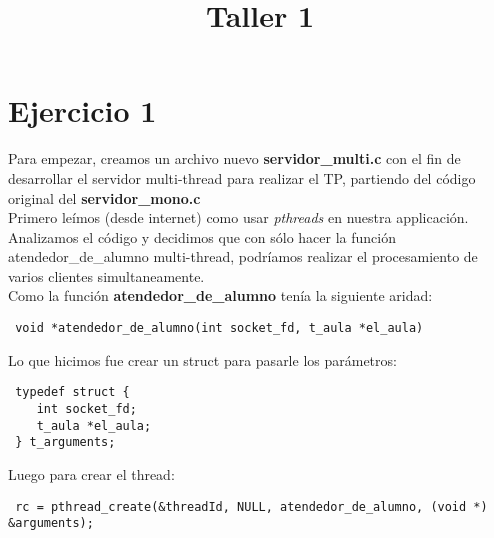 \documentclass[a4paper, 10pt]{article}
\title{Taller 1}
\begin{document}
\maketitle

\newpage

\section{Ejercicio 1}

Para empezar, creamos un archivo nuevo \textbf{servidor\_multi.c} con el fin de desarrollar el servidor multi-thread para realizar el TP, partiendo del c\'odigo original del \textbf{servidor\_mono.c} \\

Primero le\'imos (desde internet) como usar \textit{pthreads} en nuestra applicaci\'on.
Analizamos el c\'odigo y decidimos que con s\'olo hacer la funci\'on atendedor\_de\_alumno multi-thread, podr\'iamos realizar el procesamiento de varios clientes simultaneamente.\\ 

Como la funci\'on \textbf{atendedor\_de\_alumno} ten\'ia la siguiente aridad: 

\lstset{language=[ANSI]C++}
\begin{lstlisting}
 void *atendedor_de_alumno(int socket_fd, t_aula *el_aula)
\end{lstlisting} 
\vspace*{2em}

Lo que hicimos fue crear un struct para pasarle los par\'ametros:

\lstset{language=[ANSI]C++}
\begin{lstlisting}
 typedef struct {
 	int socket_fd;
 	t_aula *el_aula;
 } t_arguments;
\end{lstlisting}
\vspace*{2em}

Luego para crear el thread:

\lstset{language=[ANSI]C++}
\begin{lstlisting}
 rc = pthread_create(&threadId, NULL, atendedor_de_alumno, (void *) &arguments);
\end{lstlisting}
\vspace*{2em}
\end{document}
